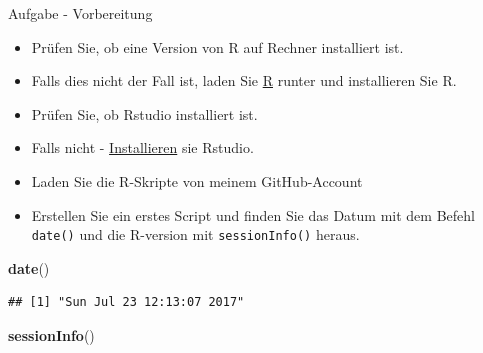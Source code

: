 \documentclass[ignorenonframetext,]{beamer}
\newenvironment{Shaded}{}{}
\newcommand{\KeywordTok}[1]{\textcolor[rgb]{0.00,0.44,0.13}{\textbf{{#1}}}}
\newcommand{\NormalTok}[1]{{#1}}
\providecommand{\tightlist}{%
\setlength{\itemsep}{0pt}\setlength{\parskip}{0pt}}
\begin{document}
\begin{frame}[fragile]{Aufgabe - Vorbereitung}

\begin{itemize}
\tightlist
\item
  Prüfen Sie, ob eine Version von R auf Rechner installiert ist.
\item
  Falls dies nicht der Fall ist, laden Sie \href{r-project.org}{R}
  runter und installieren Sie R.
\item
  Prüfen Sie, ob Rstudio installiert ist.
\item
  Falls nicht - \href{http://www.rstudio.com/}{Installieren} sie
  Rstudio.
\item
  Laden Sie die R-Skripte von meinem GitHub-Account
\item
  Erstellen Sie ein erstes Script und finden Sie das Datum mit dem
  Befehl \texttt{date()} und die R-version mit \texttt{sessionInfo()}
  heraus.
\end{itemize}

\begin{Shaded}
\begin{Highlighting}[]
\KeywordTok{date}\NormalTok{()}
\end{Highlighting}
\end{Shaded}

\begin{verbatim}
## [1] "Sun Jul 23 12:13:07 2017"
\end{verbatim}

\begin{Shaded}
\begin{Highlighting}[]
\KeywordTok{sessionInfo}\NormalTok{()}
\end{Highlighting}
\end{Shaded}


\end{frame}
\end{document}
